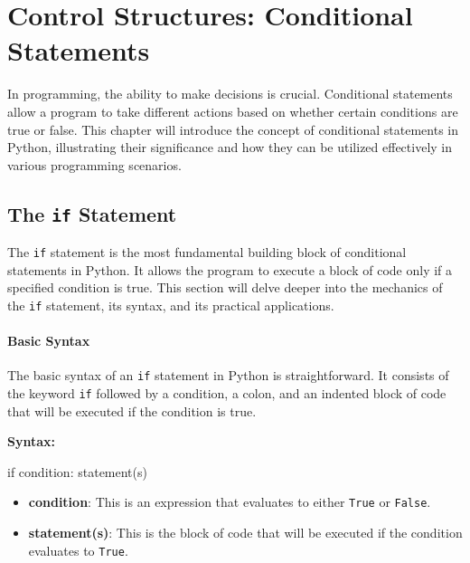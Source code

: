 \documentclass[
  letterpaper,
  DIV=11,
  numbers=noendperiod]{scrreprt}
\newenvironment{Shaded}{\begin{snugshade}}{\end{snugshade}}
\newcommand{\ControlFlowTok}[1]{\textcolor[rgb]{0.00,0.23,0.31}{#1}}
\newcommand{\NormalTok}[1]{\textcolor[rgb]{0.00,0.23,0.31}{#1}}
\providecommand{\tightlist}{%
  \setlength{\itemsep}{0pt}\setlength{\parskip}{0pt}}\usepackage{longtable,booktabs,array}
\begin{document}

\hypertarget{control-structures-conditional-statements}{%
\chapter{Control Structures: Conditional
Statements}\label{control-structures-conditional-statements}}

In programming, the ability to make decisions is crucial. Conditional
statements allow a program to take different actions based on whether
certain conditions are true or false. This chapter will introduce the
concept of conditional statements in Python, illustrating their
significance and how they can be utilized effectively in various
programming scenarios.

\hypertarget{the-if-statement}{%
\section{\texorpdfstring{The \texttt{if}
Statement}{The if Statement}}\label{the-if-statement}}

The \texttt{if} statement is the most fundamental building block of
conditional statements in Python. It allows the program to execute a
block of code only if a specified condition is true. This section will
delve deeper into the mechanics of the \texttt{if} statement, its
syntax, and its practical applications.

\hypertarget{basic-syntax}{%
\subsubsection{Basic Syntax}\label{basic-syntax}}

The basic syntax of an \texttt{if} statement in Python is
straightforward. It consists of the keyword \texttt{if} followed by a
condition, a colon, and an indented block of code that will be executed
if the condition is true.

\textbf{Syntax:}

\begin{Shaded}
\begin{Highlighting}[]
\ControlFlowTok{if}\NormalTok{ condition:}
\NormalTok{    statement(s)}
\end{Highlighting}
\end{Shaded}

\begin{itemize}
\tightlist
\item
  \textbf{condition}: This is an expression that evaluates to either
  \texttt{True} or \texttt{False}.
\item
  \textbf{statement(s)}: This is the block of code that will be executed
  if the condition evaluates to \texttt{True}.
\end{itemize}
\end{document}

